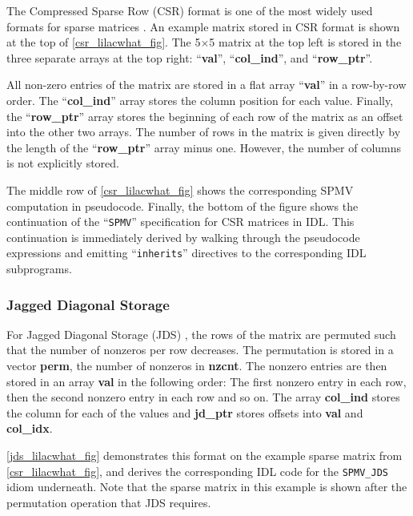     The Compressed Sparse Row (CSR) format is one of the most widely used
    formats for sparse matrices \cite{doi:10.1137/1.9780898718003}.
    An example matrix stored in CSR format is shown at the top of
    \autoref{csr_lilacwhat_fig}.
    The 5$\times$5 matrix at the top left is stored in the three separate arrays
    at the top right: ``\textbf{val}'', ``\textbf{col\_ind}'', and
    ``\textbf{row\_ptr}''.

    All non-zero entries of the matrix are stored in a flat array
    ``\textbf{val}'' in a row-by-row order.
    The ``\textbf{col\_ind}'' array stores the column position for each value.
    Finally, the ``\textbf{row\_ptr}'' array stores the beginning of each row of
    the matrix as an offset into the other two arrays.
    The number of rows in the matrix is given directly by the length of the
    ``\textbf{row\_ptr}'' array minus one.
    However, the number of columns is not explicitly stored.

    The middle row of \autoref{csr_lilacwhat_fig} shows the corresponding
    SPMV computation in pseudocode.
    Finally, the bottom of the figure shows the continuation of the
    ``{\tt SPMV}'' specification for CSR matrices in IDL.
    This continuation is immediately derived by walking through the pseudocode
    expressions and emitting ``{\tt inherits}'' directives to the corresponding
    IDL subprograms.

\subsubsection{Jagged Diagonal Storage}

    For Jagged Diagonal Storage (JDS) \cite{doi:10.1137/0910073}, the rows of
    the matrix are permuted such that the number of nonzeros per row  decreases.
    The permutation is stored in a vector \textbf{perm}, the number of nonzeros
    in \textbf{nzcnt}.
    The nonzero entries are then stored in an array \textbf{val} in the
    following order:
    The first nonzero entry in each row, then the second nonzero entry in
    each row and so on.
    The array \textbf{col\_ind} stores the column for each of the values and
    \textbf{jd\_ptr} stores offsets into \textbf{val} and \textbf{col\_idx}.

    \autoref{jds_lilacwhat_fig} demonstrates this format on the example sparse
    matrix from \autoref{csr_lilacwhat_fig}, and derives the corresponding IDL
    code for the {\tt SPMV\_JDS} idiom underneath.
    Note that the sparse matrix in this example is shown after the permutation
    operation that JDS requires.

